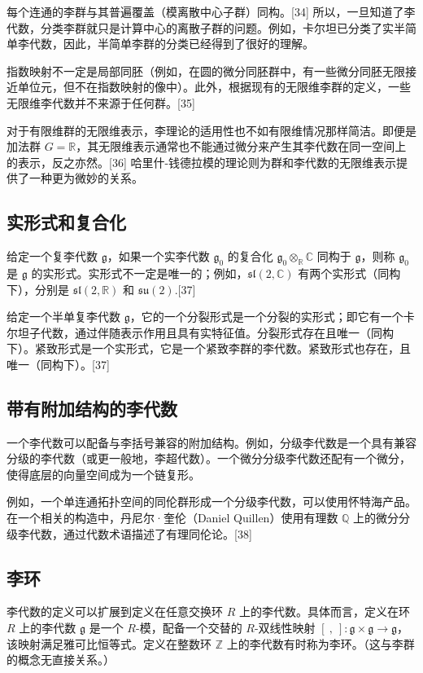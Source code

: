 每个连通的李群与其普遍覆盖（模离散中心子群）同构。[34] 所以，一旦知道了李代数，分类李群就只是计算中心的离散子群的问题。例如，卡尔坦已分类了实半简单李代数，因此，半简单李群的分类已经得到了很好的理解。

指数映射不一定是局部同胚（例如，在圆的微分同胚群中，有一些微分同胚无限接近单位元，但不在指数映射的像中）。此外，根据现有的无限维李群的定义，一些无限维李代数并不来源于任何群。[35]

对于有限维群的无限维表示，李理论的适用性也不如有限维情况那样简洁。即便是加法群 \(G = \mathbb{R}\)，其无限维表示通常也不能通过微分来产生其李代数在同一空间上的表示，反之亦然。[36] 哈里什-钱德拉模的理论则为群和李代数的无限维表示提供了一种更为微妙的关系。
\subsection{实形式和复合化}
给定一个复李代数 \({\mathfrak {g}}\)，如果一个实李代数 \({\mathfrak {g}}_0\) 的复合化 \({\mathfrak {g}}_0 \otimes_{\mathbb{R}} \mathbb{C}\) 同构于 \({\mathfrak {g}}\)，则称 \({\mathfrak {g}}_0\) 是 \({\mathfrak {g}}\) 的实形式。实形式不一定是唯一的；例如，\({\mathfrak {sl}}(2, \mathbb{C})\) 有两个实形式（同构下），分别是 \({\mathfrak {sl}}(2, \mathbb{R})\) 和 \({\mathfrak {su}}(2)\).[37]

给定一个半单复李代数 \({\mathfrak {g}}\)，它的一个分裂形式是一个分裂的实形式；即它有一个卡尔坦子代数，通过伴随表示作用且具有实特征值。分裂形式存在且唯一（同构下）。紧致形式是一个实形式，它是一个紧致李群的李代数。紧致形式也存在，且唯一（同构下）。[37]
\subsection{带有附加结构的李代数}
一个李代数可以配备与李括号兼容的附加结构。例如，分级李代数是一个具有兼容分级的李代数（或更一般地，李超代数）。一个微分分级李代数还配有一个微分，使得底层的向量空间成为一个链复形。

例如，一个单连通拓扑空间的同伦群形成一个分级李代数，可以使用怀特海产品。在一个相关的构造中，丹尼尔·奎伦（Daniel Quillen）使用有理数 \(\mathbb{Q}\) 上的微分分级李代数，通过代数术语描述了有理同伦论。[38]
\subsection{李环}
李代数的定义可以扩展到定义在任意交换环 \( R \) 上的李代数。具体而言，定义在环 \( R \) 上的李代数 \( {\mathfrak {g}} \) 是一个 \( R \)-模，配备一个交替的 \( R \)-双线性映射 \([ \ ,\ ] : {\mathfrak {g}} \times {\mathfrak {g}} \to {\mathfrak {g}}\)，该映射满足雅可比恒等式。定义在整数环 \( \mathbb{Z} \) 上的李代数有时称为李环。（这与李群的概念无直接关系。）

